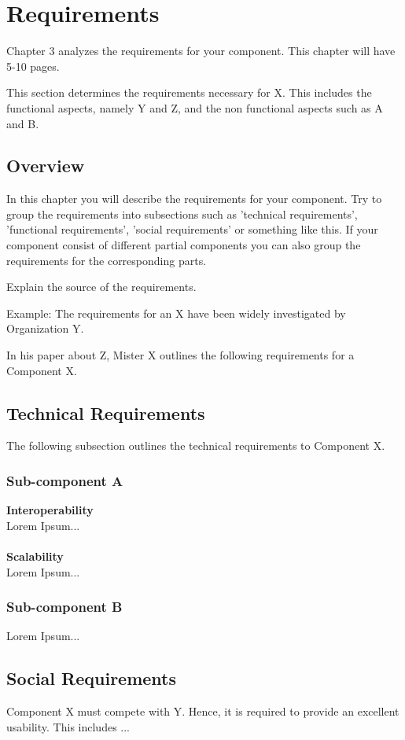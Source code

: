 \chapter{Requirements\label{cha:chapter3}}

Chapter 3 analyzes the requirements for your component. This chapter will have 5-10 pages.

This section determines the requirements necessary for X. This includes the functional
aspects, namely Y and Z, and the non functional aspects such as A and B.

\section{Overview\label{sec:reqoverview}}

In this chapter you will describe the requirements for your component. Try to group the
requirements into subsections such as 'technical requirements', 'functional requirements',
'social requirements' or something like this. If your component consist of different
partial components you can also group the requirements for the corresponding parts.

Explain the source of the requirements.

Example: The requirements for an X have been widely investigated by Organization Y.

In his paper about Z, Mister X outlines the following requirements for a Component X.

\section{Technical Requirements\label{sec:techreq}}

The following subsection outlines the technical requirements to Component X.

\subsection{Sub-component A\label{sec:reqsuba}}

\textbf{Interoperability}
\\
Lorem Ipsum...
\\
\\
\textbf{Scalability}
\\
Lorem Ipsum...

\subsection{Sub-component B\label{sec:reqsubb}}

Lorem Ipsum...

\section{Social Requirements\label{sec:socreq}}

Component X must compete with Y. Hence, it is required to provide an excellent usability.
This includes ...
